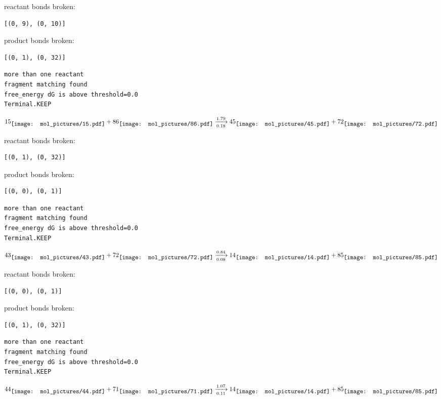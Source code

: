 \documentclass{article}
\begin{document}
reactant bonds broken:\begin{verbatim}
[(0, 9), (0, 10)]
\end{verbatim}
product bonds broken:\begin{verbatim}
[(0, 1), (0, 32)]
\end{verbatim}




\vspace{1cm}
\begin{verbatim}
more than one reactant
fragment matching found
free_energy dG is above threshold=0.0
Terminal.KEEP
\end{verbatim}
$$
15
\raisebox{-.5\height}{\texttt{[image: mol\_pictures/15.pdf]}}
+
86
\raisebox{-.5\height}{\texttt{[image: mol\_pictures/86.pdf]}}
\xrightarrow[0.18]{1.79}
45
\raisebox{-.5\height}{\texttt{[image: mol\_pictures/45.pdf]}}
+
72
\raisebox{-.5\height}{\texttt{[image: mol\_pictures/72.pdf]}}
$$


reactant bonds broken:\begin{verbatim}
[(0, 1), (0, 32)]
\end{verbatim}
product bonds broken:\begin{verbatim}
[(0, 0), (0, 1)]
\end{verbatim}




\vspace{1cm}
\begin{verbatim}
more than one reactant
fragment matching found
free_energy dG is above threshold=0.0
Terminal.KEEP
\end{verbatim}
$$
43
\raisebox{-.5\height}{\texttt{[image: mol\_pictures/43.pdf]}}
+
72
\raisebox{-.5\height}{\texttt{[image: mol\_pictures/72.pdf]}}
\xrightarrow[0.08]{0.84}
14
\raisebox{-.5\height}{\texttt{[image: mol\_pictures/14.pdf]}}
+
85
\raisebox{-.5\height}{\texttt{[image: mol\_pictures/85.pdf]}}
$$


reactant bonds broken:\begin{verbatim}
[(0, 0), (0, 1)]
\end{verbatim}
product bonds broken:\begin{verbatim}
[(0, 1), (0, 32)]
\end{verbatim}




\vspace{1cm}
\begin{verbatim}
more than one reactant
fragment matching found
free_energy dG is above threshold=0.0
Terminal.KEEP
\end{verbatim}
$$
44
\raisebox{-.5\height}{\texttt{[image: mol\_pictures/44.pdf]}}
+
71
\raisebox{-.5\height}{\texttt{[image: mol\_pictures/71.pdf]}}
\xrightarrow[0.11]{1.07}
14
\raisebox{-.5\height}{\texttt{[image: mol\_pictures/14.pdf]}}
+
85
\raisebox{-.5\height}{\texttt{[image: mol\_pictures/85.pdf]}}
$$
\end{document}
